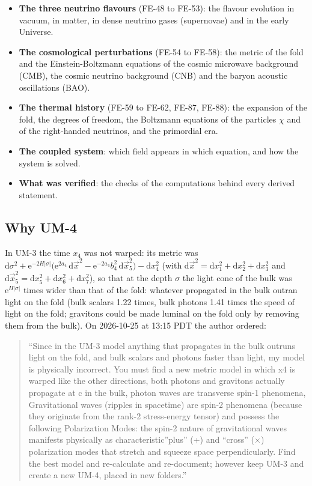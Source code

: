 \documentclass[
  10pt,
]{article}
\begin{document}
\begin{itemize}
  mixing matrices and the four-dimensional couplings of the particles
  \(\chi\) of dirac16complex.
\item
  \textbf{The three neutrino flavours} (FE-48 to FE-53): the flavour
  evolution in vacuum, in matter, in dense neutrino gases (supernovae)
  and in the early Universe.
\item
  \textbf{The cosmological perturbations} (FE-54 to FE-58): the metric
  of the fold and the Einstein-Boltzmann equations of the cosmic
  microwave background (CMB), the cosmic neutrino background (CNB) and
  the baryon acoustic oscillations (BAO).
\item
  \textbf{The thermal history} (FE-59 to FE-62, FE-87, FE-88): the
  expansion of the fold, the degrees of freedom, the Boltzmann equations
  of the particles \(\chi\) and of the right-handed neutrinos, and the
  primordial era.
\item
  \textbf{The coupled system}: which field appears in which equation,
  and how the system is solved.
\item
  \textbf{What was verified}: the checks of the computations behind
  every derived statement.
\end{itemize}

\hypertarget{why-um-4}{%
\subsection{Why UM-4}\label{why-um-4}}

In UM-3 the time \(x_4\) was not warped: its metric was
\(\mathrm{d}\sigma^2 + \mathrm{e}^{-2H\lvert\sigma\rvert}\big(\mathrm{e}^{2a_4}\,\mathrm{d}\vec x^2 - \mathrm{e}^{-2a_4}b_4^2\,\mathrm{d}\vec x_5^2\big) - \mathrm{d}x_4^2\)
(with
\(\mathrm{d}\vec x^2 = \mathrm{d}x_1^2 + \mathrm{d}x_2^2 + \mathrm{d}x_3^2\)
and
\(\mathrm{d}\vec x_5^2 = \mathrm{d}x_5^2 + \mathrm{d}x_6^2 + \mathrm{d}x_7^2\)),
so that at the depth \(\sigma\) the light cone of the bulk was
\(\mathrm{e}^{H\lvert\sigma\rvert}\) times wider than that of the fold:
whatever propagated in the bulk outran light on the fold (bulk scalars
1.22 times, bulk photons 1.41 times the speed of light on the fold;
gravitons could be made luminal on the fold only by removing them from
the bulk). On 2026-10-25 at 13:15 PDT the author ordered:

\begin{quote}
``Since in the UM-3 model anything that propagates in the bulk outruns
light on the fold, and bulk scalars and photons faster than light, my
model is physically incorrect. You must find a new metric model in which
x4 is warped like the other directions, both photons and gravitons
actually propagate at c in the bulk, photon waves are transverse spin-1
phenomena, Gravitational waves (ripples in spacetime) are spin-2
phenomena (because they originate from the rank-2 stress-energy tensor)
and possess the following Polarization Modes: the spin-2 nature of
gravitational waves manifests physically as characteristic''plus'' (+)
and ``cross'' (×) polarization modes that stretch and squeeze space
perpendicularly. Find the best model and re-calculate and re-document;
however keep UM-3 and create a new UM-4, placed in new folders.''
\end{quote}
\end{document}
